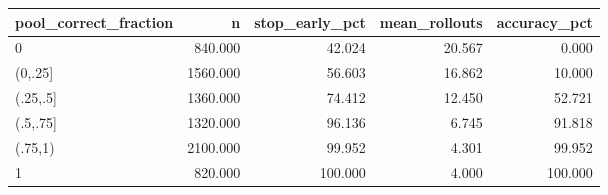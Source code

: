 \begin{tabular}{lrrrr}
\toprule
pool\_correct\_fraction & n & stop\_early\_pct & mean\_rollouts & accuracy\_pct \\
\midrule
0 & 840.000 & 42.024 & 20.567 & 0.000 \\
(0,.25] & 1560.000 & 56.603 & 16.862 & 10.000 \\
(.25,.5] & 1360.000 & 74.412 & 12.450 & 52.721 \\
(.5,.75] & 1320.000 & 96.136 & 6.745 & 91.818 \\
(.75,1) & 2100.000 & 99.952 & 4.301 & 99.952 \\
1 & 820.000 & 100.000 & 4.000 & 100.000 \\
\bottomrule
\end{tabular}
